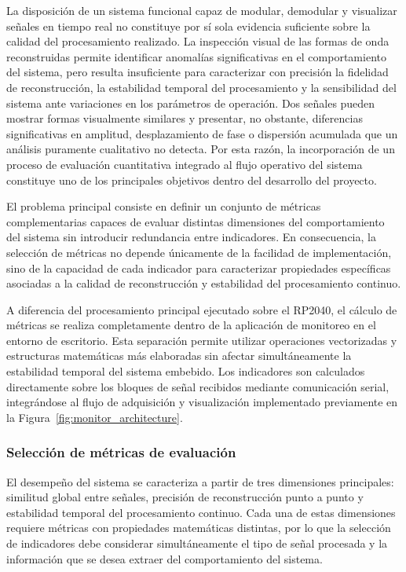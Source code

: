 La disposición de un sistema funcional capaz de modular, demodular y visualizar señales en tiempo real no constituye por sí sola evidencia suficiente sobre la calidad del procesamiento realizado. La inspección visual de las formas de onda reconstruidas permite identificar anomalías significativas en el comportamiento del sistema, pero resulta insuficiente para caracterizar con precisión la fidelidad de reconstrucción, la estabilidad temporal del procesamiento y la sensibilidad del sistema ante variaciones en los parámetros de operación. Dos señales pueden mostrar formas visualmente similares y presentar, no obstante, diferencias significativas en amplitud, desplazamiento de fase o dispersión acumulada que un análisis puramente cualitativo no detecta. Por esta razón, la incorporación de un proceso de evaluación cuantitativa integrado al flujo operativo del sistema constituye uno de los principales objetivos dentro del desarrollo del proyecto.

El problema principal consiste en definir un conjunto de métricas complementarias capaces de evaluar distintas dimensiones del comportamiento del sistema sin introducir redundancia entre indicadores. En consecuencia, la selección de métricas no depende únicamente de la facilidad de implementación, sino de la capacidad de cada indicador para caracterizar propiedades específicas asociadas a la calidad de reconstrucción y estabilidad del procesamiento continuo.

A diferencia del procesamiento principal ejecutado sobre el RP2040, el cálculo de métricas se realiza completamente dentro de la aplicación de monitoreo en el entorno de escritorio. Esta separación permite utilizar operaciones vectorizadas y estructuras matemáticas más elaboradas sin afectar simultáneamente la estabilidad temporal del sistema embebido. Los indicadores son calculados directamente sobre los bloques de señal recibidos mediante comunicación serial, integrándose al flujo de adquisición y visualización implementado previamente en la Figura~\ref{fig:monitor_architecture}.

\subsubsection{Selección de métricas de evaluación}

El desempeño del sistema se caracteriza a partir de tres dimensiones principales: similitud global entre señales, precisión de reconstrucción punto a punto y estabilidad temporal del procesamiento continuo. Cada una de estas dimensiones requiere métricas con propiedades matemáticas distintas, por lo que la selección de indicadores debe considerar simultáneamente el tipo de señal procesada y la información que se desea extraer del comportamiento del sistema.

